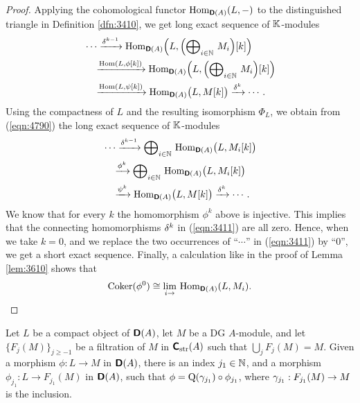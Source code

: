 \begin{proof}
Applying the cohomological functor $\operatorname{Hom}_{\boldsymbol{\mathsf{D}}(A)}(L, -)$
to the distinguished triangle in Definition \ref{dfn:3410}, we get 
long exact sequence of $\mathbb{K}$-modules
\begin{equation}  \label{eqn:4790}
\begin{aligned}
&
\cdots \xrightarrow{\delta^{k - 1}}
\operatorname{Hom}_{\boldsymbol{\mathsf{D}}(A)} \Bigl( L, 
\Bigl( \bigoplus\nolimits_{i \in \mathbb{N}} \, M_i \Bigr)[k] \Bigr)
\\
& \quad
\xrightarrow{ \operatorname{Hom}(L, \phi[k]) }
\operatorname{Hom}_{\boldsymbol{\mathsf{D}}(A)} \Bigl( L, 
\Bigl( \bigoplus\nolimits_{i \in \mathbb{N}} \, M_i \Bigr)[k] \Bigr)
\\
& \quad  
\xrightarrow{ \operatorname{Hom}(L, \psi[k]) }
\operatorname{Hom}_{\boldsymbol{\mathsf{D}}(A)} \bigl( L, M[k] \bigr) \xrightarrow{\delta^{k}}  \cdots .
\end{aligned}
\end{equation}
Using the compactness of $L$ and the resulting isomorphism $\Phi_L$, we obtain 
from (\ref{eqn:4790}) the long exact sequence of $\mathbb{K}$-modules
\begin{equation}  \label{eqn:3411}
\begin{aligned}
&
\cdots \xrightarrow{\delta^{k - 1}} 
\bigoplus\nolimits_{i \in \mathbb{N}} \, \operatorname{Hom}_{\boldsymbol{\mathsf{D}}(A)} 
\bigl( L, M_i[k] \bigr) 
\\
& \quad  
\xrightarrow{\phi^k} \bigoplus\nolimits_{i \in \mathbb{N}} \, 
\operatorname{Hom}_{\boldsymbol{\mathsf{D}}(A)} \bigl( L, M_i[k] \bigr) 
\\
& \quad  
\xrightarrow{\psi^k} \operatorname{Hom}_{\boldsymbol{\mathsf{D}}(A)} \bigl( L, M[k] \bigr)  \xrightarrow{\delta^{k}}  
\cdots . 
\end{aligned}
\end{equation}
We know that for every $k$ the homomorphism $\phi^k$ above is 
injective. This implies that the connecting homomorphisms $\delta^k$
in (\ref{eqn:3411}) are all zero. Hence, when we take $k = 0$, and we 
replace the two occurrences of  
``$\cdots$'' in (\ref{eqn:3411}) by ``$0$'', we get a short exact sequence.  
Finally, a calculation like in the proof of Lemma \ref{lem:3610} shows that 
\[ \operatorname{Coker}(\phi^0) \cong
\lim_{i \to} \, \operatorname{Hom}_{\boldsymbol{\mathsf{D}}(A)}(L, M_i) . \qedhere \]
\end{proof}

\begin{lem} \label{lem:3406} 
Let $L$ be a compact object of $\boldsymbol{\mathsf{D}}(A)$, let $M$ be a DG $A$-module, 
and let $\{ F_j(M) \}_{j \geq -1}$ be a filtration of $M$ in
$\boldsymbol{\mathsf{C}}_{\mathrm{str}}(A)$ such that 
$\bigcup_j F_j(M) = M$. Given a morphism 
$\phi : L \to M$ in $\boldsymbol{\mathsf{D}}(A)$, there is an index $j_1 \in \mathbb{N}$, and a 
morphism $\phi_{j_1} : L \to F_{j_1}(M)$ in $\boldsymbol{\mathsf{D}}(A)$, 
such that 
$\phi = \operatorname{Q}(\gamma_{j_1}) \circ \phi_{j_1}$,
where $\gamma_{j_1} : F_{j_1}(M) \to M$ is the inclusion. 
\end{lem}

